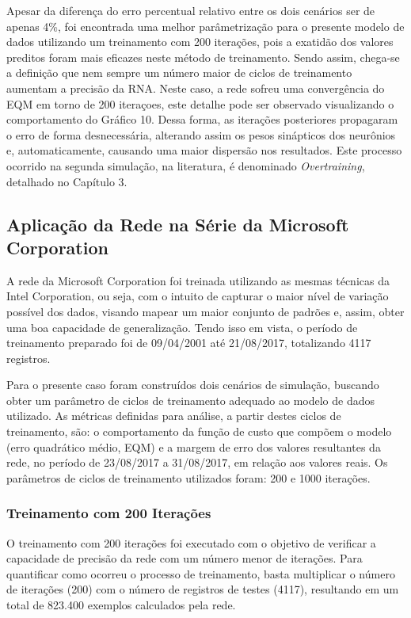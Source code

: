 Apesar da diferença do erro percentual relativo entre os dois cenários ser de apenas 4\%, foi encontrada uma melhor parâmetrização para o presente modelo de dados utilizando um treinamento com 200 iterações, pois a exatidão dos valores preditos foram mais eficazes neste método de treinamento. Sendo assim, chega-se a definição que nem sempre um número maior de ciclos de treinamento aumentam a precisão da RNA. Neste caso, a rede sofreu uma convergência do EQM em torno de 200 iteraçoes, este detalhe pode ser observado visualizando o comportamento do Gráfico 10. Dessa forma, as iterações posteriores propagaram o erro de forma desnecessária, alterando assim os pesos sinápticos dos neurônios e, automaticamente, causando uma maior dispersão nos resultados. Este processo ocorrido na segunda simulação, na literatura, é denominado \textit{Overtraining}, detalhado no Capítulo 3.

\subsection{Aplicação da Rede na Série da Microsoft Corporation}
A rede da Microsoft Corporation foi treinada utilizando as mesmas técnicas da Intel Corporation, ou seja, com o intuito de capturar o maior nível de variação possível dos dados, visando mapear um maior conjunto de padrões e, assim, obter uma boa capacidade de generalização. Tendo isso em vista, o período de treinamento preparado foi de 09/04/2001 até 21/08/2017, totalizando 4117 registros.

Para o presente caso foram construídos dois cenários de simulação, buscando obter um parâmetro de ciclos de treinamento adequado ao modelo de dados utilizado. As métricas definidas para análise, a partir destes ciclos de treinamento, são: o comportamento da função de custo que compõem o modelo (erro quadrático médio, EQM) e a margem de erro dos valores resultantes da rede, no período de 23/08/2017 a 31/08/2017, em relação aos valores reais. Os parâmetros de ciclos de treinamento utilizados foram: 200 e 1000 iterações.

\subsubsection{Treinamento com 200 Iterações}	
O treinamento com 200 iterações foi executado com o objetivo de verificar a capacidade de precisão da rede com um número menor de iterações. Para quantificar como ocorreu o processo de treinamento, basta multiplicar o número de iterações (200) com o número de registros de testes (4117), resultando em um total de 823.400 exemplos calculados pela rede.

